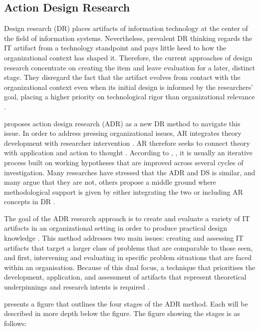 \subsection{Action Design Research}
\par{Design research (DR) places artifacts of information technology at the center of the field of information systems. Nevertheless, prevalent DR thinking regards the IT artifact from a technology standpoint and pays little heed to how the organizational context has shaped it. Therefore, the current approaches of design research concentrate on creating the item and leave evaluation for a later, distinct stage. They disregard the fact that the artifact evolves from contact with the organizational context even when its initial design is informed by the researchers' goal, placing a higher priority on technological rigor than organizational relevance \citep{sein2011action}.}
\par{\cite{sein2011action} proposes action design research (ADR) as a new DR method to navigate this issue. In order to address pressing organizational issues, AR integrates theory development with researcher intervention \citep{baburoglu1992normative,baskerville1998diversity}. AR therefore seeks to connect theory with application and action to thought \citep{susman1983action}. According to \cite{davison2004principles}, \cite{susman2023assessment}, it is usually an iterative process built on working hypotheses that are improved across several cycles of investigation. Many researches have stressed that the ADR and DS is similar, and many argue that they are not, others propose a middle ground where methodological support is given by either integrating the two \citep{sein2011action} or including AR concepts in DR \citep{pries2007soft}. }
\par{The goal of the ADR research approach is to create and evaluate a variety of IT artifacts in an organizational setting in order to produce practical design knowledge \citep{sein2011action}. This method addresses two main issues: creating and assessing IT artifacts that target a larger class of problems that are comparable to those seen, and first, intervening and evaluating in specific problem situations that are faced within an organisation. Because of this dual focus, a technique that prioritises the development, application, and assessment of artifacts that represent theoretical underpinnings and research intents is required \citep{sein2011action}.}
\par{\cite{sein2011action} presents a figure that outlines the four stages of the ADR method. Each will be described in more depth below the figure. The figure showing the stages is as follows:}
